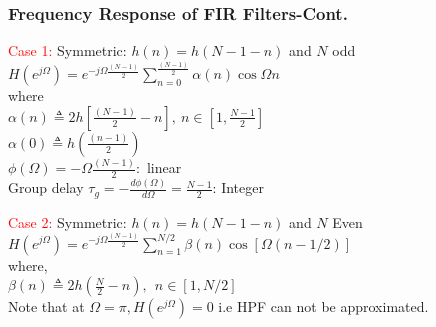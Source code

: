 \documentclass[mathserif, 10pt]{beamer} %
\begin{document}
\frame
{

\small
\frametitle{Frequency Response of FIR Filters-Cont.}
\textcolor{red}{Case 1:} Symmetric: $h(n) = h(N-1-n)$ and $N$ odd \\ \vspace{.1in}
$H(e^{j\Omega}) = e^{-j\Omega \frac{(N-1)}{2}}\sum\limits_{n=0}^{\frac{(N-1)}{2}} \alpha(n) \cos{\Omega n}$\\
where\\
$\alpha(n) \triangleq 2h\left[ \frac{(N-1)}{2}-n\right],~n\in[1,\frac{N-1}{2}]$\\
$\alpha(0) \triangleq h\left(\frac{(n-1)}{2}\right)$\\
$\phi(\Omega) = -\Omega\frac{(N-1)}{2}:$  linear\\ \vspace{.1in}
Group delay $\tau_g = -\frac{d\phi(\Omega)}{d\Omega} = \frac{N-1}{2}$:  Integer\\ \vspace{.2in}

\textcolor{red}{Case 2:} Symmetric: $h(n) = h(N-1-n)$ and $N$ Even \\ \vspace{.1in}
$H(e^{j\Omega}) = e^{-j\Omega\frac{(N-1)}{2}}\sum\limits_{n=1}^{N/2} \beta(n) \cos{[\Omega(n-1/2)]}$\\
where,\\
$\beta(n) \triangleq 2h(\frac{N}{2}-n), ~~n\in[1,N/2]$\\ \vspace{.07in}
Note that at $\Omega = \pi, H(e^{j\Omega}) = 0$ i.e HPF can not be approximated.


}
\end{document}
